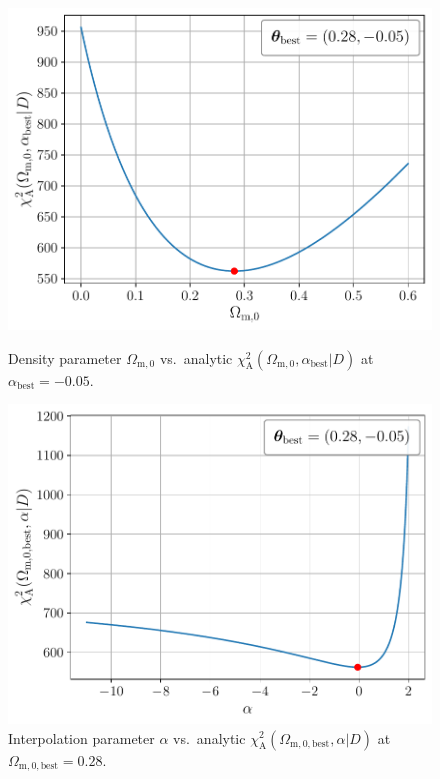 \begin{figure}[]
    \begin{minipage}{8cm}
        \centering
        \includegraphics[scale=0.50]{figures/plots/PDF/DGP-analytic-chi2_Omega-m0-vs-chi2-at-alpha-best.pdf}
        \caption{Density parameter $\Omega_{\text{m},0}$ vs.\ analytic $\chi_{\text{A}}^2(\Omega_{\text{m},0}, \alpha_{\text{best}} \vert D)$ at $\alpha_{\text{best}} = -0.05$.}
        \label{fig:DGP-analytic-chi2_Omega-m0-vs-chi2-at-alpha-best}
    \end{minipage}
    \hspace*{0.5cm}
    \begin{minipage}{8.2cm}
       \centering
       \includegraphics[scale=0.50]{figures/plots/PDF/DGP-analytic-chi2_alpha-vs-chi2-at-Omega-m0-best.pdf}
       \caption{Interpolation parameter $\alpha$ vs.\ analytic $\chi_{\text{A}}^2(\Omega_{\text{m}, 0, \text{best}}, \alpha \vert D)$ at $\Omega_{\text{m}, 0, \text{best}} = 0.28$.}
       \label{fig:DGP-analytic-chi2_alpha-vs-chi2-at-Omega-m0-best}
    \end{minipage}
\end{figure}

